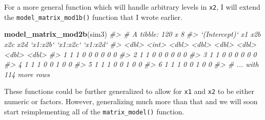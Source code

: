 \documentclass[]{book}
\newenvironment{Shaded}{\begin{snugshade}}{\end{snugshade}}
\newcommand{\CommentTok}[1]{\textcolor[rgb]{0.56,0.35,0.01}{\textit{#1}}}
\newcommand{\ControlFlowTok}[1]{\textcolor[rgb]{0.13,0.29,0.53}{\textbf{#1}}}
\newcommand{\KeywordTok}[1]{\textcolor[rgb]{0.13,0.29,0.53}{\textbf{#1}}}
\newcommand{\NormalTok}[1]{#1}
\newcommand{\OperatorTok}[1]{\textcolor[rgb]{0.81,0.36,0.00}{\textbf{#1}}}
\newcommand{\StringTok}[1]{\textcolor[rgb]{0.31,0.60,0.02}{#1}}
\theoremstyle{plain}
\theoremstyle{remark}
\begin{document}
For a more general function which will handle arbitrary levels in \texttt{x2}, I will
extend the \texttt{model\_matrix\_mod1b()} function that I wrote earlier.

\begin{Shaded}
\end{Shaded}

\begin{Shaded}
\begin{Highlighting}[]
\KeywordTok{model_matrix_mod2b}\NormalTok{(sim3)}
\CommentTok{#> # A tibble: 120 x 8}
\CommentTok{#>   `(Intercept)`    x1   x2b   x2c   x2d `x1:x2b` `x1:x2c` `x1:x2d`}
\CommentTok{#>           <dbl> <int> <dbl> <dbl> <dbl>    <dbl>    <dbl>    <dbl>}
\CommentTok{#> 1             1     1     0     0     0        0        0        0}
\CommentTok{#> 2             1     1     0     0     0        0        0        0}
\CommentTok{#> 3             1     1     0     0     0        0        0        0}
\CommentTok{#> 4             1     1     1     0     0        1        0        0}
\CommentTok{#> 5             1     1     1     0     0        1        0        0}
\CommentTok{#> 6             1     1     1     0     0        1        0        0}
\CommentTok{#> # ... with 114 more rows}
\end{Highlighting}
\end{Shaded}

These functions could be further generalized to allow for \texttt{x1} and \texttt{x2} to
be either numeric or factors. However, generalizing much more than that and
we will soon start reimplementing all of the \texttt{matrix\_model()} function.
\end{document}
